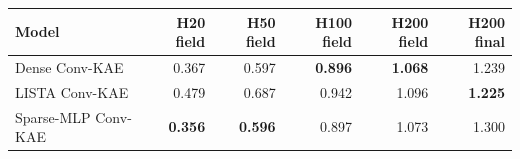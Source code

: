\begin{tabular}{lrrrrr}
\toprule
Model & H20 field & H50 field & H100 field & H200 field & H200 final \\
\midrule
Dense Conv-KAE & 0.367 & 0.597 & \textbf{0.896} & \textbf{1.068} & 1.239 \\
LISTA Conv-KAE & 0.479 & 0.687 & 0.942 & 1.096 & \textbf{1.225} \\
Sparse-MLP Conv-KAE & \textbf{0.356} & \textbf{0.596} & 0.897 & 1.073 & 1.300 \\
\bottomrule
\end{tabular}
